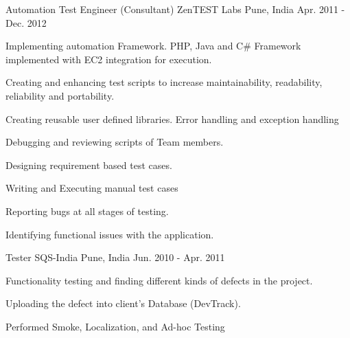 \begin{cventries}
  \cventry
    {Automation Test Engineer (Consultant)} %
    {ZenTEST Labs} %
    {Pune, India} %
    {Apr. 2011 - Dec. 2012} %
    {
      \begin{cvitems} %
        \item {Implementing automation Framework. PHP, Java and C\# Framework implemented with EC2 integration for execution.}
        \item {Creating and enhancing test scripts to increase maintainability, readability, reliability and portability.}
        \item {Creating reusable user defined libraries. Error handling and exception handling}
        \item {Debugging and reviewing scripts of Team members.}
        \item {Designing requirement based test cases.}
       \item {Writing and Executing manual test cases}
       \item {Reporting bugs at all stages of testing.}
      \item {Identifying functional issues with the application.}
      \end{cvitems}
    }

  \cventry
    {Tester} %
    {SQS-India } %
    {Pune, India} %
    {Jun. 2010 - Apr. 2011} %
    {
      \begin{cvitems} %
        \item {Functionality testing and finding different kinds of defects in the project.}
        \item {Uploading the defect into client’s Database (DevTrack).}
        \item {Performed Smoke, Localization, and Ad-hoc Testing}
      \end{cvitems}
    }

\end{cventries}
